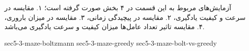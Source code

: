 آزمایش‌های مربوط به این قسمت در ۴ بخش صورت گرفته است؛ ۱. مقایسه در سرعت و کیفیت یادگیری، ۲. مقایسه در پیچیدگی زمانی، ۳. مقایسه در میزان باروری، ۴. مقایسه تاثیر تعداد عامل‌ها میزان کیفیت و سرعت یادگیری می‌باشد.

{sec5-3-maze-boltzmann}
{sec5-3-maze-greedy}
{sec5-3-maze-bolt-vs-greedy}